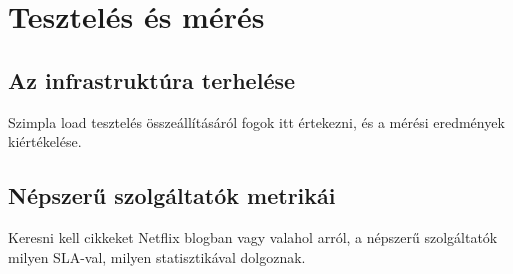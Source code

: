 \chapter{Tesztelés és mérés}

\section{Az infrastruktúra terhelése}

Szimpla load tesztelés összeállításáról fogok itt értekezni, és a mérési eredmények kiértékelése.

\section{Népszerű szolgáltatók metrikái}

Keresni kell cikkeket Netflix blogban vagy valahol arról, a népszerű szolgáltatók milyen SLA-val, milyen statisztikával dolgoznak.

